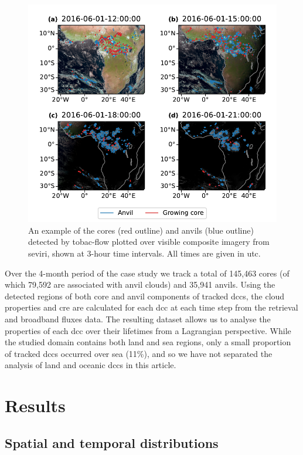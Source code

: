 \documentclass[acp, manuscript]{copernicus}
\begin{document}
\begin{figure}[tp]
    \includegraphics[width=12cm]{figures/fig04.pdf}
    \caption[
    An example of the cores and anvils (detected by tobac-flow, shown at 3-hour time intervals
    ]{
    An example of the cores (red outline) and anvils (blue outline) detected by tobac-flow plotted over visible composite imagery from \acrshort{seviri}, shown at 3-hour time intervals. All times are given in \acrshort{utc}.
    }
    \label{fig:seviri_detection}
\end{figure}


Over the 4-month period of the case study we track a total of 145,463 cores (of which 79,592 are associated with anvil clouds) and 35,941 anvils. 
Using the detected regions of both core and anvil components of tracked \acrshort{dcc}s, the cloud properties and \acrshort{cre} are calculated for each \acrshort{dcc} at each time step from the retrieval and broadband fluxes data. 
The resulting dataset allows us to analyse the properties of each \acrshort{dcc} over their lifetimes from a Lagrangian perspective.
While the studied domain contains both land and sea regions, only a small proportion of tracked \acrshort{dcc}s occurred over sea (11\%), and so we have not separated the analysis of land and oceanic \acrshort{dcc}s in this article.

\section{Results}

\subsection{Spatial and temporal distributions}
\end{document}

